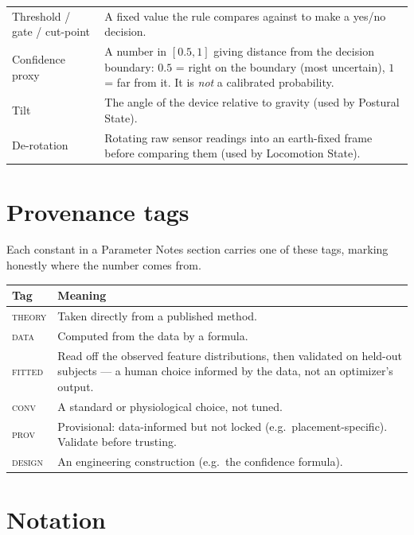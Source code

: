 \begin{center}
\begin{tabular}{@{}>{\raggedright\arraybackslash}p{3.6cm} >{\raggedright\arraybackslash}p{10.8cm}@{}}
Threshold / gate / cut-point & A fixed value the rule compares against to make a yes/no decision. \\
Confidence proxy & A number in $[0.5,1]$ giving distance from the decision boundary: $0.5$ = right on the boundary (most uncertain), $1$ = far from it. It is \emph{not} a calibrated probability. \\
Tilt & The angle of the device relative to gravity (used by Postural State). \\
De-rotation & Rotating raw sensor readings into an earth-fixed frame before comparing them (used by Locomotion State). \\
\bottomrule
\end{tabular}
\end{center}

\section*{Provenance tags}

Each constant in a Parameter Notes section carries one of these tags, marking honestly where
the number comes from.

\begin{center}
\begin{tabular}{@{}l >{\raggedright\arraybackslash}p{11.4cm}@{}}
\toprule
\textbf{Tag} & \textbf{Meaning} \\
\midrule
\textsc{theory}  & Taken directly from a published method. \\
\textsc{data}    & Computed from the data by a formula. \\
\textsc{fitted}  & Read off the observed feature distributions, then validated on held-out subjects --- a human choice informed by the data, not an optimizer's output. \\
\textsc{conv}    & A standard or physiological choice, not tuned. \\
\textsc{prov}    & Provisional: data-informed but not locked (e.g.\ placement-specific). Validate before trusting. \\
\textsc{design}  & An engineering construction (e.g.\ the confidence formula). \\
\bottomrule
\end{tabular}
\end{center}

\section*{Notation}

